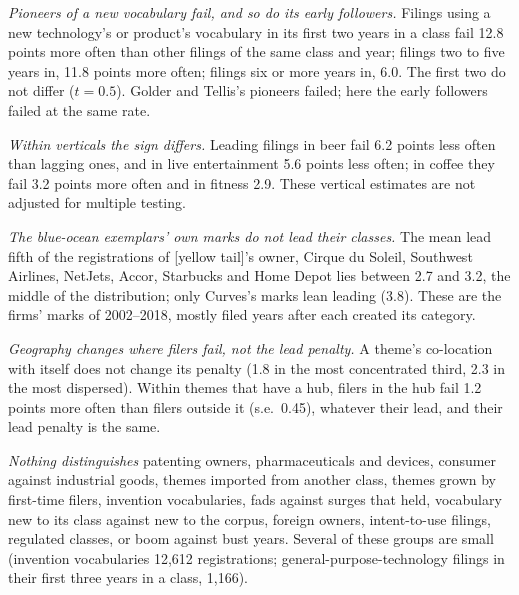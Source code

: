 \emph{Pioneers of a new vocabulary fail, and so do its early followers.}
Filings using a new technology's or product's vocabulary in its first two
years in a class fail 12.8 points more often than other filings of the
same class and year; filings two to five years in, 11.8 points more
often; filings six or more years in, 6.0. The first two do not differ
($t = 0.5$). Golder and Tellis's pioneers failed; here the early followers
failed at the same rate.

\emph{Within verticals the sign differs.} Leading filings in beer fail
6.2 points less often than lagging ones, and in live entertainment 5.6
points less often; in coffee they fail 3.2 points more often and in
fitness 2.9. These vertical estimates are not adjusted for multiple
testing.

\emph{The blue-ocean exemplars' own marks do not lead their classes.}
The mean lead fifth of the registrations of [yellow tail]'s owner,
Cirque du Soleil, Southwest Airlines, NetJets, Accor, Starbucks and Home
Depot lies between 2.7 and 3.2, the middle of the distribution; only
Curves's marks lean leading (3.8). These are the firms' marks of
2002--2018, mostly filed years after each created its category.

\emph{Geography changes where filers fail, not the lead penalty.} A theme's
co-location with itself does not change its penalty (1.8 in the most
concentrated third, 2.3 in the most dispersed). Within themes that have a
hub, filers in the hub fail 1.2 points more often than filers outside it
(s.e.\ 0.45), whatever their lead, and their lead penalty is the same.

\emph{Nothing distinguishes} patenting owners, pharmaceuticals and
devices, consumer against industrial goods, themes imported from another
class, themes grown by first-time filers, invention vocabularies, fads
against surges that held, vocabulary new to its class against new to the
corpus, foreign owners, intent-to-use filings, regulated classes, or
boom against bust years. Several of these groups are small (invention
vocabularies 12,612 registrations; general-purpose-technology filings in
their first three years in a class, 1,166).
